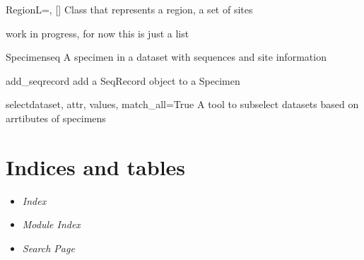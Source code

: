 \documentclass[letterpaper,10pt,english]{manual}
\begin{document}
\hypertarget{SnailBase.Region}{}\begin{classdesc}{Region}{L=, {[}{]}}
Class that represents a region, a set of sites

work in progress, for now this is just a list
\end{classdesc}

\hypertarget{SnailBase.Specimen}{}\begin{classdesc}{Specimen}{seq}
A specimen in a dataset with sequences and site information

\hypertarget{SnailBase.Specimen.add\_seq}{}\begin{methoddesc}{add\_seq}{record}
add a SeqRecord object to a Specimen
\end{methoddesc}
\end{classdesc}

\hypertarget{SnailBase.select}{}\begin{funcdesc}{select}{dataset, attr, values, match\_all=True}
A tool to subselect datasets based on arrtibutes of specimens
\end{funcdesc}


\chapter{Indices and tables}
\begin{itemize}
\item {} 
\emph{Index}

\item {} 
\emph{Module Index}

\item {} 
\emph{Search Page}

\end{itemize}


\renewcommand{\indexname}{Module Index}
\printmodindex
\renewcommand{\indexname}{Index}
\printindex
\end{document}
